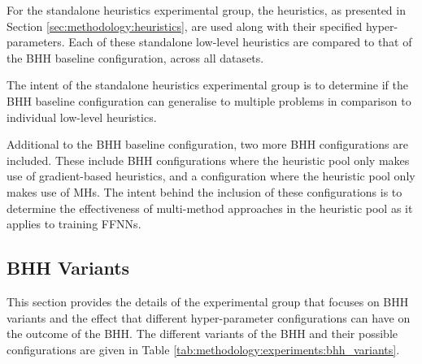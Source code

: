 For the standalone heuristics experimental group, the heuristics, as presented in Section \ref{sec:methodology:heuristics}, are used along with their specified hyper-parameters. Each of these standalone low-level heuristics are compared to that of the \acs{BHH} baseline configuration, across all datasets.

The intent of the standalone heuristics experimental group is to determine if the \acs{BHH} baseline configuration can generalise to multiple problems in comparison to individual low-level heuristics.

Additional to the \acs{BHH} baseline configuration, two more \acs{BHH} configurations are included. These include \acs{BHH} configurations where the heuristic pool only makes use of gradient-based heuristics, and a configuration where the heuristic pool only makes use of \acp{MH}. The intent behind the inclusion of these configurations is to determine the effectiveness of multi-method approaches in the heuristic pool as it applies to training \acp{FFNN}.

\subsection{BHH Variants}
\label{sec:methodology:experiments:bhh_variants}

This section provides the details of the experimental group that focuses on \acs{BHH} variants and the effect that different hyper-parameter configurations can have on the outcome of the \acs{BHH}. The different variants of the \acs{BHH} and their possible configurations are given in Table \ref{tab:methodology:experiments:bhh_variants}.

